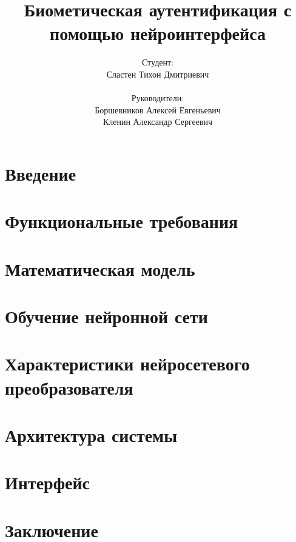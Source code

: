 \documentclass{beamer}
\title{Биометическая аутентификация с помощью нейроинтерфейса}
\author{
    Студент: \\ Сластен Тихон Дмитриевич \\ \\
    Руководители: \\ Боршевников Алексей Евгеньевич \\ Кленин Александр Сергеевич}
\institute{Б8303а Прикладная математика и информатика}
\date{}
\begin{document}
\maketitle

\section{Введение}





\section{Функциональные требования}



\section{Математическая модель}





\section{Обучение нейронной сети}



\section{Характеристики нейросетевого преобразователя}


\section{Архитектура системы}



\section{Интерфейс}



\section{Заключение}

\end{document}
